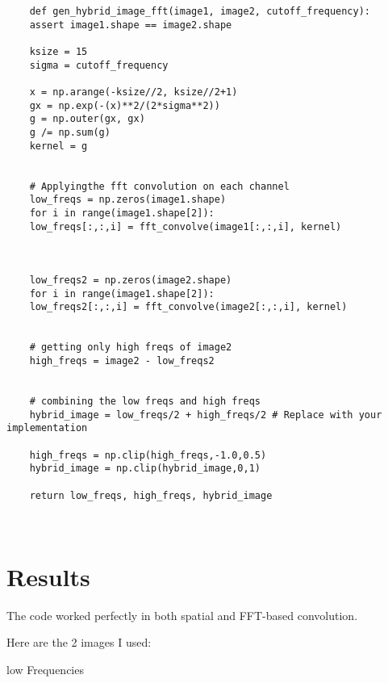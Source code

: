 \documentclass[11pt]{article}
\begin{document}
	\begin{lstlisting}
	def gen_hybrid_image_fft(image1, image2, cutoff_frequency):
	assert image1.shape == image2.shape
	
	ksize = 15
	sigma = cutoff_frequency
	
	x = np.arange(-ksize//2, ksize//2+1)
	gx = np.exp(-(x)**2/(2*sigma**2))
	g = np.outer(gx, gx)
	g /= np.sum(g)
	kernel = g
	
	
	# Applyingthe fft convolution on each channel
	low_freqs = np.zeros(image1.shape)
	for i in range(image1.shape[2]):
	low_freqs[:,:,i] = fft_convolve(image1[:,:,i], kernel)
	
	
	
	low_freqs2 = np.zeros(image2.shape)
	for i in range(image1.shape[2]):
	low_freqs2[:,:,i] = fft_convolve(image2[:,:,i], kernel)
	
	
	# getting only high freqs of image2
	high_freqs = image2 - low_freqs2
	
	
	# combining the low freqs and high freqs
	hybrid_image = low_freqs/2 + high_freqs/2 # Replace with your implementation
	
	high_freqs = np.clip(high_freqs,-1.0,0.5)
	hybrid_image = np.clip(hybrid_image,0,1)
	
	return low_freqs, high_freqs, hybrid_image
	
	
	\end{lstlisting}
	\newpage
	
	\section{Results}
	The code worked perfectly in both spatial and FFT-based convolution.
	
	
	Here are the 2 images I used:
	
	low Frequencies

	
	
	
	
\end{document}
